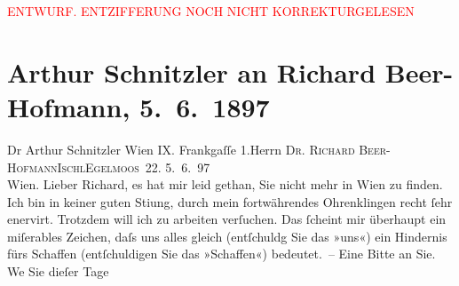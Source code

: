 
\begin{center}
            \textcolor{red}{ENTWURF. ENTZIFFERUNG NOCH NICHT KORREKTURGELESEN}
                      \end{center}
            
               \section[Arthur Schnitzler an Richard Beer-Hofmann, 5. 6. 1897]{ Arthur Schnitzler an Richard Beer-Hofmann, 5. 6. 1897}\nopagebreak{}\rehead{ }\begin{ledgroupsized}[t]{13cm}\normalsize\beginnumbering{} \toendnotes[C]{\smallbreak\pagebreak[2]} 
\toendnotes[C]{\smallbreak}\pstart{}{\pb}Dr Arthur Schnitzler Wien IX. Frankgaſſe 1.\pend{}{\bigskip}\pstart{}{\pb}Herrn \textsc{Dr. Richard
                     Beer-Hofmann}\pend{}\pstart{}\textsc{Ischl}\pend{}\pstart{}\textsc{Egelmoos 22}.\pend{}{\bigskip}\pstart
           \raggedleft{}{\pb}5. 6. 97{\\}Wien. \pend
           \pstart
           Lieber Richard, es hat mir leid gethan, Sie nicht mehr in Wien zu finden. Ich bin in keiner guten Sti{\geminationm}ung, durch mein fortwährendes Ohrenklingen recht ſehr
               enervirt. Trotzdem will ich zu arbeiten verſuchen. Das ſcheint mir überhaupt ein
               miſerables Zeichen, daſs uns alles gleich (entſchuldg Sie das »uns«) ein Hindernis
               fürs {\pb}Schaffen (entſchuldigen Sie das »Schaffen«)
               bedeutet. – Eine Bitte an Sie. We{\geminationn} Sie dieſer Tage

\end{ledgroupsized}
